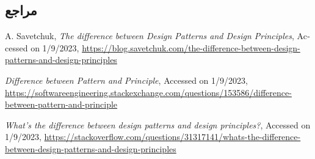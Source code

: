 {\subsection*{مراجع}

\begin{latin}
	\begingroup
	\renewcommand{\section}[2]{}%
	
\begin{thebibliography}{9}
	A. Savetchuk,
	\textit{The difference between Design Patterns and Design Principles},
	Accessed on 1/9/2023,
	\url{https://blog.savetchuk.com/the-difference-between-design-patterns-and-design-principles}
	
	
	\textit{Difference between Pattern and Principle},
	Accessed on 1/9/2023,
	\url{https://softwareengineering.stackexchange.com/questions/153586/difference-between-pattern-and-principle}

	\textit{What's the difference between design patterns and design principles?},
	Accessed on 1/9/2023,
	\url{https://stackoverflow.com/questions/31317141/whats-the-difference-between-design-patterns-and-design-principles}
\end{thebibliography}
\endgroup
\end{latin}

}
